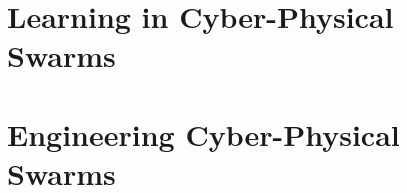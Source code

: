 \documentclass[12pt,a4paper,oneside]{book}
\begin{document}
\part{Learning in Cyber-Physical Swarms}
\begin{refsection}\end{refsection}
\begin{refsection}\end{refsection}
\begin{refsection}\end{refsection}
\begin{refsection}\end{refsection}
\begin{refsection}\end{refsection}
\part{Engineering Cyber-Physical Swarms}
\begin{refsection}\end{refsection}
\begin{refsection}\end{refsection}
\begin{refsection}\end{refsection}
\begin{refsection}\end{refsection}
\begin{refsection}\end{refsection}
\begin{refsection}\end{refsection}

\begin{refsection}\end{refsection}
\end{document}
